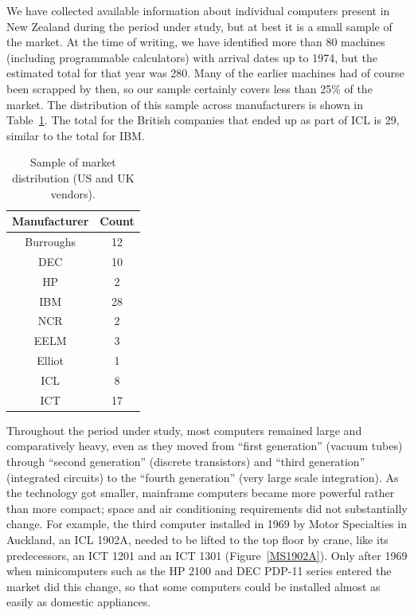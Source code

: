 \documentclass{IEEEcsmag}
\begin{document}
We have collected available information about individual computers present in New Zealand during the period under study, but at best it is a small sample of the market. At the time of writing, we have identified more than 80 machines (including programmable calculators) with arrival dates up to 1974, but the estimated total for that year was 280. Many of the earlier machines had of course been scrapped by then, so our sample certainly covers less than 25\% of the market. The distribution of this sample across manufacturers is shown in Table~\ref{TotalManuf}. The total for the British companies that ended up as part of ICL is 29, similar to the total for IBM.

\begin{table}[h]
\begin{center}
\begin{tabular}{ |c|c| } 
 \hline
Manufacturer & Count\\ 
\hline
Burroughs & 12\\
DEC & 10\\
HP & 2\\
IBM & 28\\
NCR & 2\\\hline
EELM & 3\\
Elliot & 1\\
ICL & 8\\
ICT & 17\\ 

\hline
\end{tabular}
\vspace{1ex}
\caption{\label{TotalManuf}Sample of market distribution (US and UK vendors).}
\end{center}
\end{table}

Throughout the period under study, most computers remained large and comparatively heavy, even as they moved from “first generation” (vacuum tubes) through “second generation” (discrete transistors) and “third generation” (integrated circuits) to the “fourth generation” (very large scale integration). As the technology got smaller, mainframe computers became more powerful rather than more compact; space and air conditioning requirements did not substantially change. For example, the third computer installed in 1969 by Motor Specialties in Auckland, an ICL 1902A, needed to be lifted to the top floor by crane, like its predecessors, an ICT 1201 and an ICT 1301 (Figure~\ref{MS1902A}). Only after 1969 when minicomputers such as the HP 2100 and DEC PDP-11 series entered the market did this change, so that some computers could be installed almost as easily as domestic appliances.
\end{document}
